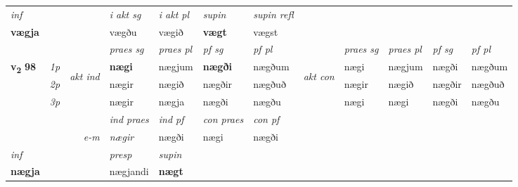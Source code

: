 \begin{longtable}[l]{X>{\footnotesize\itshape}llXXXXlXXXX}
   {\textit{inf}} & &  & \textit{i akt sg} & \textit{i akt pl}    & \textit{supin} & \textit{supin refl}  \\*
  {\textbf{vægja}} & && vægðu  & vægið    &  \textbf{vægt} & vægst  \\*

\midrule

 & &   & \textit{praes sg}  & \textit{praes pl}    & \textit{ pf sg} & \textit{pf pl} & & \textit{praes sg}  & \textit{praes pl}    & \textit{pf sg} & \textit{pf pl }  \\ \cmidrule{4-7} \cmidrule{9-12}
 \multirow{2}{*}{{{\textbf{v{\textsubscript{2}}} \Large{\textbf{98}}}}}  & 1p & \multirow{3}{*}{\begin{turn}{90}\textit{akt ind}\end{turn}} & \textbf{nægi} & nægjum & \textbf{nægði} & nægðum & \multirow{3}{*}{\begin{turn}{90}\textit{akt con}\end{turn}} &nægi & nægjum & nægði & nægðum\\*
 & 2p &  &  nægir  & nægið & nægðir & nægðuð & & nægir & nægið & nægðir & nægðuð \\*
 & 3p &  & nægir & nægja & nægði & nægðu & & nægi & nægi& nægði & nægðu \\*
\cmidrule{4-7} \cmidrule{9-12}

   && &  \textit{ind praes} & \textit{ind pf} & \textit{con praes} & \textit{con pf} \\*
\multicolumn{3}{r}{\textit{e-m}} & nægir & nægði & nægi & nægði \\*

\cmidrule{4-7}
   {\textit{inf}} & &     & \textit{presp} & \textit{supin}   \\*
  {\textbf{nægja}} & &     & nægjandi &  \textbf{nægt}   \\*
\midrule


\end{longtable}
